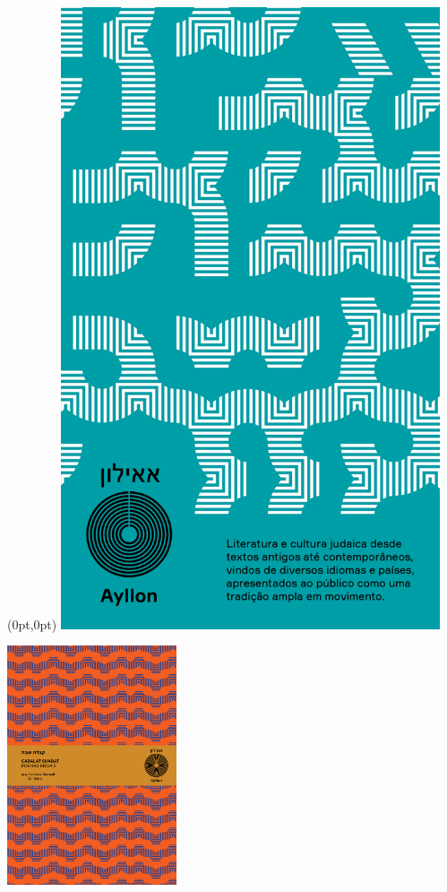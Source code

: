 \pagestyle{ayllon}
\label{ayllon}


\begin{textblock*}{5.625in}(0pt,0pt)%
\vspace*{-1.45cm}
\hspace*{-1.2cm}\includegraphics*[width=112mm]{./imgs/AYLLON.png}
\end{textblock*}

\pagebreak

\hspace{.5cm}

\begin{center}
\hspace*{-.5cm}\includegraphics[width=50mm]{./imgs/cabalat.png}
\end{center}

